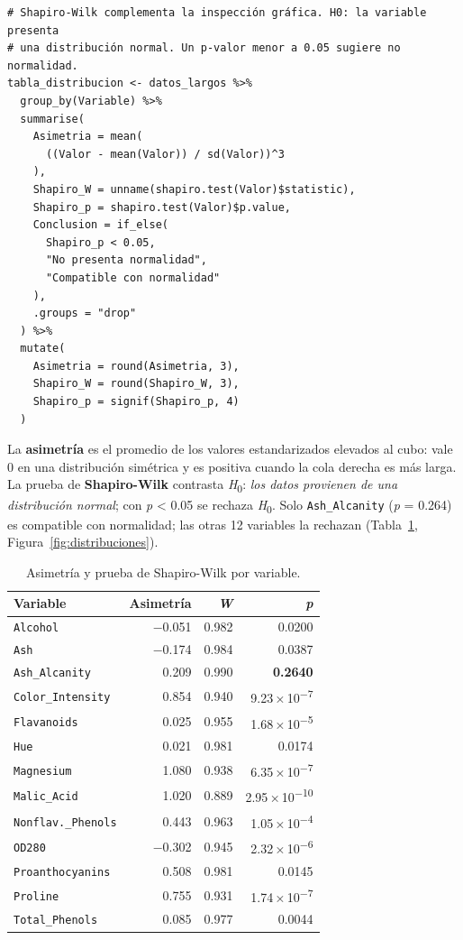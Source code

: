 \documentclass[10pt,letterpaper,twocolumn]{article}
\newcommand{\var}[1]{\texttt{#1}}
\newcommand{\Hcero}{\textit{H}\textsubscript{0}}
\newcommand{\pval}{\textit{p}}
\newcommand{\sci}[2]{#1\,×\,10\textsuperscript{−#2}}
\begin{document}
\begin{lstlisting}[firstnumber=276]
# Shapiro-Wilk complementa la inspección gráfica. H0: la variable presenta
# una distribución normal. Un p-valor menor a 0.05 sugiere no normalidad.
tabla_distribucion <- datos_largos %>%
  group_by(Variable) %>%
  summarise(
    Asimetria = mean(
      ((Valor - mean(Valor)) / sd(Valor))^3
    ),
    Shapiro_W = unname(shapiro.test(Valor)$statistic),
    Shapiro_p = shapiro.test(Valor)$p.value,
    Conclusion = if_else(
      Shapiro_p < 0.05,
      "No presenta normalidad",
      "Compatible con normalidad"
    ),
    .groups = "drop"
  ) %>%
  mutate(
    Asimetria = round(Asimetria, 3),
    Shapiro_W = round(Shapiro_W, 3),
    Shapiro_p = signif(Shapiro_p, 4)
  )
\end{lstlisting}

La \textbf{asimetría} es el promedio de los valores estandarizados elevados al cubo: vale 0 en una distribución simétrica y es positiva cuando la cola derecha es más larga. La prueba de \textbf{Shapiro-Wilk} contrasta \Hcero: \textit{los datos provienen de una distribución normal}; con \pval{} < 0.05 se rechaza \Hcero. Solo \var{Ash\_Alcanity} (\pval{} = 0.264) es compatible con normalidad; las otras 12 variables la rechazan (Tabla~\ref{tab:distribucion}, Figura~\ref{fig:distribuciones}).

\begin{table}[htbp]
  \centering
  \caption{Asimetría y prueba de Shapiro-Wilk por variable.}
  \label{tab:distribucion}
  \footnotesize
  \begin{tabular}{@{}lrrr@{}}
    \toprule
    \textbf{Variable} & \textbf{Asimetría} & \textbf{\textit{W}} & \textbf{\textit{p}} \\
    \midrule
    \var{Alcohol}              & −0.051 & 0.982 & 0.0200 \\
    \var{Ash}                  & −0.174 & 0.984 & 0.0387 \\
    \var{Ash\_Alcanity}        & 0.209  & 0.990 & \textbf{0.2640} \\
    \var{Color\_Intensity}     & 0.854  & 0.940 & \sci{9.23}{7} \\
    \var{Flavanoids}           & 0.025  & 0.955 & \sci{1.68}{5} \\
    \var{Hue}                  & 0.021  & 0.981 & 0.0174 \\
    \var{Magnesium}            & 1.080  & 0.938 & \sci{6.35}{7} \\
    \var{Malic\_Acid}          & 1.020  & 0.889 & \sci{2.95}{10} \\
    \var{Nonflav.\_Phenols}    & 0.443  & 0.963 & \sci{1.05}{4} \\
    \var{OD280}                & −0.302 & 0.945 & \sci{2.32}{6} \\
    \var{Proanthocyanins}      & 0.508  & 0.981 & 0.0145 \\
    \var{Proline}              & 0.755  & 0.931 & \sci{1.74}{7} \\
    \var{Total\_Phenols}       & 0.085  & 0.977 & 0.0044 \\
    \bottomrule
  \end{tabular}
\end{table}
\end{document}
